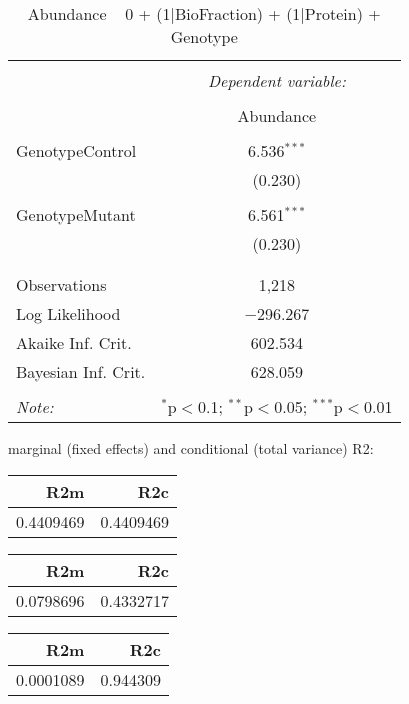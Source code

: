 \documentclass[11pt]{report}
\begin{document}
\begin{table}[!htbp] \centering 
  \caption{Abundance ~ 0 + (1|BioFraction) + (1|Protein) + Genotype} 
  \label{} 
\begin{tabular}{@{\extracolsep{5pt}}lc} 
\\[-1.8ex]\hline 
\hline \\[-1.8ex] 
 & \multicolumn{1}{c}{\textit{Dependent variable:}} \\ 
\cline{2-2} 
\\[-1.8ex] & Abundance \\ 
\hline \\[-1.8ex] 
 GenotypeControl & 6.536$^{***}$ \\ 
  & (0.230) \\ 
  & \\ 
 GenotypeMutant & 6.561$^{***}$ \\ 
  & (0.230) \\ 
  & \\ 
\hline \\[-1.8ex] 
Observations & 1,218 \\ 
Log Likelihood & $-$296.267 \\ 
Akaike Inf. Crit. & 602.534 \\ 
Bayesian Inf. Crit. & 628.059 \\ 
\hline 
\hline \\[-1.8ex] 
\textit{Note:}  & \multicolumn{1}{r}{$^{*}$p$<$0.1; $^{**}$p$<$0.05; $^{***}$p$<$0.01} \\ 
\end{tabular} 
\end{table} 
marginal (fixed effects) and conditional (total variance) R2:

\begin{tabular}{r|r}
\hline
R2m & R2c\\
\hline
0.4409469 & 0.4409469\\
\hline
\end{tabular}

\begin{tabular}{r|r}
\hline
R2m & R2c\\
\hline
0.0798696 & 0.4332717\\
\hline
\end{tabular}

\begin{tabular}{r|r}
\hline
R2m & R2c\\
\hline
0.0001089 & 0.944309\\
\hline
\end{tabular}
\end{document}
